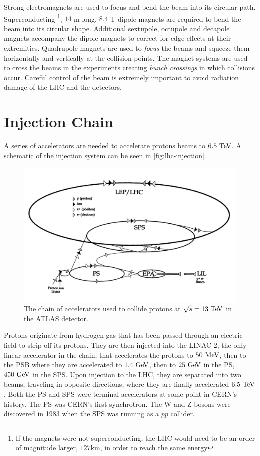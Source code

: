 Strong electromagnets are used to focus and bend the beam into its circular path. Superconducting \footnote{If the magnets were not superconducting, the \ac{LHC} would need to be an order of magnitude larger, $127 \textrm{km}$, in order to reach the same energy}, $14$ m long, $8.4$ T dipole magnets are required to bend the beam into its circular shape. Additional sextupole, octupole and decapole magnets accompany the dipole magnets to  correct for edge effects at their extremities. Quadrupole magnets are used to \emph{focus} the beams and squeeze them horizontally and vertically at the collision points. The magnet systems are used to cross the beams in the experiments creating \emph{bunch crossings} in which collisions occur. Careful control of the beam is extremely important to avoid radiation damage of the \ac{LHC} and the detectors. 

\section{Injection Chain}

A series of accelerators are needed to accelerate protons beams to $6.5 \TeV$. A schematic of the injection system can be seen in \autoref{fig:lhc-injection}. 

\begin{figure}[htbp]
\centering
\includegraphics[width=.6\textwidth]{figures/Detector/lhc-injectors.png}
\caption{The chain of accelerators used to collide protons at $\sqrt{s} = 13 \TeV$ in the \ac{ATLAS} detector. \cite{accelerator-sketch} }
\label{fig:lhc-injection}
\end{figure}

Protons originate from hydrogen gas that has been passed through an electric field to strip off its protons. They are then injected into the \ac{LINAC} 2, the only linear accelerator in the chain, that accelerates the protons to $50 \MeV$, then to the \ac{PSB} where they are accelerated to $1.4 \GeV$, then to $25 \GeV$ in the \ac{PS}, $450 \GeV$ in the \ac{SPS}. Upon injection to the \ac{LHC}, they are separated into two beams, traveling in opposite directions, where they are finally accelerated $6.5 \TeV$. Both the \ac{PS} and \ac{SPS} were terminal accelerators at some point in \ac{CERN}'s history. The \ac{PS} was \ac{CERN}'s first synchrotron. The W and Z bosons were discovered in 1983 when the \ac{SPS} was running as a $p\bar{p}$ collider.



